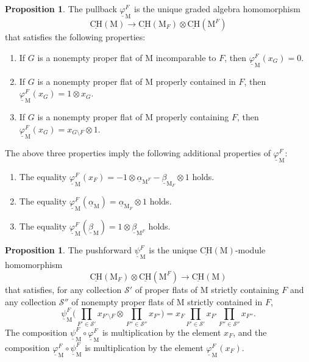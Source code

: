 \documentclass[11pt,reqno]{amsart}
\theoremstyle{definition}
\newtheorem{proposition}[theorem]{Proposition}
\theoremstyle{remark}
\renewcommand{\(}{\left(}
\renewcommand{\)}{\right)}
\newcommand{\<}{\left<}
\renewcommand{\>}{\right>}
\begin{document}
\begin{proposition}\label{DefinitionUnderlinedPull}
The pullback $\underline{\varphi}^F_\mathrm{M}$ is the unique graded algebra homomorphism
\[
 \underline{\mathrm{CH}}(\mathrm{M}) \longrightarrow  \underline{\mathrm{CH}}(\mathrm{M}_F) \otimes \underline{\mathrm{CH}}(\mathrm{M}^F) 
\]
that satisfies the following properties:
\begin{enumerate}[$\bullet$]\itemsep 5pt
\item If $G$ is a nonempty proper flat of $\mathrm{M}$ incomparable to $F$, then $\underline{\varphi}^F_\mathrm{M}(x_G)=0$.
\item If $G$ is a nonempty proper flat of $\mathrm{M}$ properly contained in $F$, then $\underline{\varphi}^F_\mathrm{M}(x_G)=1 \otimes x_G$.
\item If $G$ is a nonempty proper flat of $\mathrm{M}$ properly containing $F$, then $\underline{\varphi}^F_\mathrm{M}(x_G)=x_{G \setminus F} \otimes 1$.
\end{enumerate}
 The above three properties imply the following additional properties of $\underline{\varphi}^F_\mathrm{M}$:
\begin{enumerate}[$\bullet$]\itemsep 5pt
\item The equality $\underline{\varphi}^F_\mathrm{M}(x_F)=-1\otimes\underline{\alpha}_{\mathrm{M}^F}-\underline{\beta}_{\mathrm{M}_F} \otimes 1$ holds.
\item The equality $\underline{\varphi}^F_\mathrm{M}(\underline{\alpha}_\mathrm{M})= \underline{\alpha}_{\mathrm{M}_F} \otimes 1$ holds. %
\item The equality $\underline{\varphi}^F_\mathrm{M}(\underline{\beta}_\mathrm{M})=1 \otimes \underline{\beta}_{\mathrm{M}^F}$ holds. \end{enumerate}
\end{proposition}

\begin{proposition}\label{DefinitionUnderlinedPush}
The pushforward $ \underline{\psi}^F_\mathrm{M}$ is the unique  $ \underline{\mathrm{CH}}(\mathrm{M})$-module homomorphism
\[
\underline{\mathrm{CH}}(\mathrm{M}_F)  \otimes \underline{\mathrm{CH}}(\mathrm{M}^F) \longrightarrow \underline{\mathrm{CH}}(\mathrm{M})
 \]
 that satisfies,
for any collection $\mathscr{S}'$ of proper flats of $\mathrm{M}$ strictly containing $F$
and any collection $\mathscr{S}''$ of nonempty proper flats of $\mathrm{M}$ strictly contained in $F$,
\[
\underline{\psi}^F_\mathrm{M}\Bigg( \prod_{F' \in \mathscr{S}'} x_{F' \setminus F}  \otimes \prod_{F'' \in \mathscr{S}''} x_{F''}\Bigg)=x_F \prod_{F' \in \mathscr{S}'} x_{F'} \prod_{F'' \in \mathscr{S}''} x_{F''}.
\]
The composition  $\underline{\psi}_\mathrm{M}^F \circ \underline{\varphi}_\mathrm{M}^F$ is multiplication by the element $x_F$,
and  the composition  $\underline{\varphi}_\mathrm{M}^F \circ \underline{\psi}_\mathrm{M}^F$ is multiplication by the element $\underline{\varphi}_\mathrm{M}^F(x_F)$.
\end{proposition}
\end{document}
